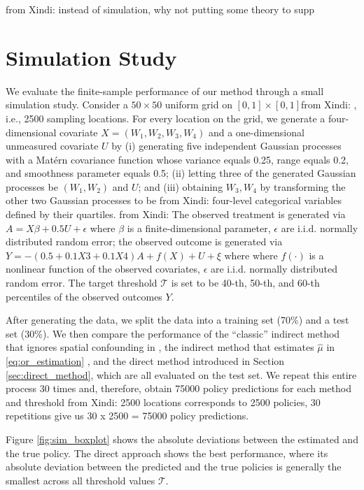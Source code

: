 \documentclass[12pt]{article}
\newcommand{\XL}[1]{{\color{blue}from Xindi: #1}}
\begin{document}
\XL{instead of simulation, why not putting some theory to supp}
\section{Simulation Study}\label{sec:simulation}
We evaluate the finite-sample performance of our method through a small simulation study. Consider a $50\times 50$ uniform grid on $[0,1]\times [0,1]$\XL{, i.e., 2500 sampling locations}. For every location on the grid, we generate a four-dimensional covariate $X = (W_1,W_2,W_3,W_4)$ and a one-dimensional unmeasured covariate $U$ by (i) generating five independent Gaussian processes with a Mat\'ern covariance function whose variance equals 0.25, range equals 0.2, and smoothness parameter equals 0.5; (ii) letting three of the generated Gaussian processes be $(W_1,W_2)$ and $U$; and (iii) obtaining $W_3,W_4$ by transforming the other two Gaussian processes to be \XL{four-level }categorical variables defined by their quartiles. \XL{The observed treatment is generated via $A = X\beta + 0.5 U + \epsilon$ where $\beta$ is a finite-dimensional parameter, $\epsilon$ are i.i.d. normally distributed random error; the observed outcome is generated via $Y = -(0.5 + 0.1X3 +0.1X4) A + f(X)+U +\xi$ where where $f(\cdot)$ is a nonlinear function of the observed covariates, $\epsilon$ are i.i.d. normally distributed random error.} The target threshold $\mathcal{T}$ is set to be 40-th, 50-th, and 60-th percentiles of the observed outcomes $Y$.

After generating the data, we split the data into a training set (70\%) and a test set (30\%). We then compare the performance of the ``classic'' indirect method that ignores spatial confounding in \citet{chakraborty2013statistical}, the indirect method that estimates $\widehat\mu$ in \eqref{eq:or_estimation} , and the direct method introduced in Section \ref{sec:direct_method}, which are all evaluated on the test set. We repeat this entire process 30 times and, therefore, obtain 75000 policy predictions for each method and threshold \XL{2500 locations corresponds to 2500 policies, 30 repetitions give us 30 x 2500  = 75000 policy predictions}.

Figure \ref{fig:sim_boxplot} shows the absolute deviations between the estimated and the true policy. The direct approach shows the best performance, where its absolute deviation between the predicted and the true policies is generally the smallest across all threshold values $\mathcal{T}$.
\end{document}
